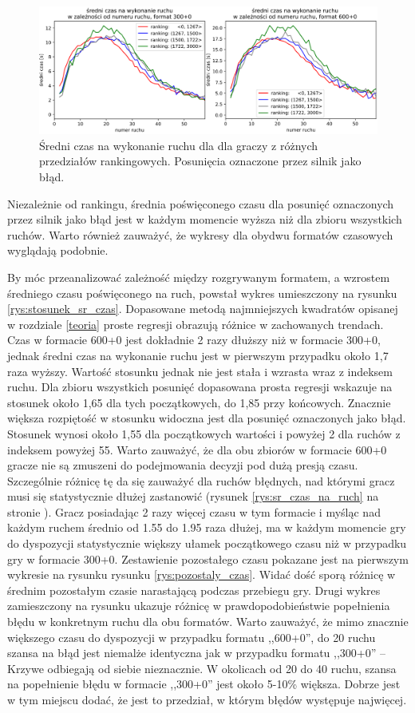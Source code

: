 \documentclass[inzynierska]{pwr_wmat_praca_dyplomowa}
\theoremstyle{plain}
\numberwithin{theorem}{chapter}
\theoremstyle{definition}
\numberwithin{theorem}{chapter}
\begin{document}
\begin{figure}[H]
	\centering
	\includegraphics[width=\textwidth]{sr_czas_na_ruch_ELO_2.png}
	\caption{Średni czas na wykonanie ruchu dla dla graczy z różnych przedziałów rankingowych. Posunięcia oznaczone przez silnik jako błąd.}
	\label{rys:sr_czas_na_ruch_ELO_2}
\end{figure}
Niezależnie od rankingu, średnia poświęconego czasu dla posunięć oznaczonych przez silnik jako błąd jest w każdym momencie wyższa niż dla zbioru wszystkich ruchów. 
Warto również zauważyć, że wykresy dla obydwu formatów czasowych wyglądają podobnie. 

By móc przeanalizować zależność między rozgrywanym formatem, a wzrostem średniego czasu poświęconego na ruch, powstał wykres umieszczony na rysunku \ref{rys:stosunek_sr_czas}. Dopasowane metodą najmniejszych kwadratów opisanej w rozdziale \ref{teoria} proste regresji obrazują różnice w zachowanych trendach. Czas w formacie 600+0 jest dokładnie 2 razy dłuższy niż w formacie 300+0, jednak średni czas na wykonanie ruchu jest w pierwszym przypadku około 1,7 raza wyższy. Wartość stosunku jednak nie jest stała i wzrasta wraz z indeksem ruchu. Dla zbioru wszystkich posunięć dopasowana prosta regresji wskazuje na stosunek około 1,65 dla tych początkowych, do 1,85 przy końcowych. Znacznie większa rozpiętość w stosunku widoczna jest dla posunięć oznaczonych jako błąd. Stosunek wynosi około 1,55 dla początkowych wartości i powyżej 2 dla ruchów z indeksem powyżej 55. Warto zauważyć, że dla obu zbiorów w formacie 600+0 gracze nie są zmuszeni do podejmowania decyzji pod dużą presją czasu. Szczególnie różnicę tę da się zauważyć dla ruchów błędnych, nad którymi gracz musi się statystycznie dłużej zastanowić (rysunek \ref{rys:sr_czas_na_ruch} na stronie \pageref{rys:sr_czas_na_ruch}). Gracz posiadając 2 razy więcej czasu w tym formacie i myśląc nad każdym ruchem średnio od 1.55 do 1.95 raza dłużej,  ma w każdym momencie gry do dyspozycji statystycznie większy ułamek początkowego czasu niż w przypadku gry w formacie 300+0. Zestawienie pozostałego czasu pokazane jest na pierwszym wykresie na rysunku rysunku \ref{rys:pozostaly_czas}. Widać dość sporą różnicę w średnim pozostałym czasie narastającą podczas przebiegu gry. Drugi wykres zamieszczony na rysunku ukazuje różnicę w prawdopodobieństwie popełnienia błędu w konkretnym ruchu dla obu formatów. Warto zauważyć, że mimo znacznie większego czasu do dyspozycji w przypadku formatu ,,600+0'', do 20 ruchu szansa na błąd jest niemalże identyczna jak w przypadku formatu ,,300+0'' -- Krzywe odbiegają od siebie nieznacznie. W okolicach od 20 do 40 ruchu, szansa na popełnienie błędu w formacie ,,300+0'' jest około 5-10\% większa. Dobrze jest w tym miejscu dodać, że jest to przedział, w którym błędów występuje najwięcej.
\end{document}
